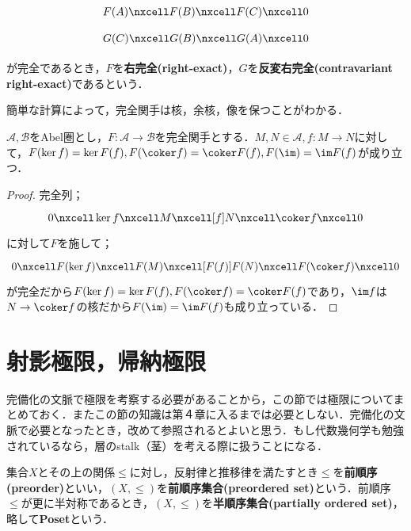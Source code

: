 \[\begin{tikzcd}
F(A)\nxcell F(B)\nxcell F(C)\nxcell0
\end{tikzcd}\]
\[\begin{tikzcd}
G(C)\nxcell G(B)\nxcell G(A)\nxcell 0
\end{tikzcd}\]

が完全であるとき，$F$を\textbf{右完全(right-exact)}，$G$を\textbf{反変右完全(contravariant right-exact)}であるという．

簡単な計算によって，完全関手は核，余核，像を保つことがわかる．
\begin{prop}\label{prop:完全関手は核，像を保つ}
	$\mathscr{A},\mathscr{B}$をAbel圏とし，$F:\mathscr{A}\to\mathscr{B}$を完全関手とする．$M,N\in\mathscr{A},f:M\to N$に対して，$F(\ker f)=\ker F(f),F(\coker f)=\coker F(f),F(\im)=\im F(f)$が成り立つ． 
\end{prop}

\begin{proof}
	完全列；
	\[\begin{tikzcd}
	0\nxcell\ker f\nxcell M\nxcell[f] N\nxcell\coker f\nxcell0
	\end{tikzcd}\]
	に対して$F$を施して；
	\[\begin{tikzcd}
	0\nxcell F(\ker f)\nxcell F(M)\nxcell[F(f)]F(N)\nxcell F(\coker f)\nxcell0
	\end{tikzcd}\]
	が完全だから$F(\ker f)=\ker F(f),F(\coker f)=\coker F(f)$であり，$\im f$は$N\to\coker f$の核だから$F(\im)=\im F(f)$も成り立っている．
\end{proof}

\section{射影極限，帰納極限}

完備化の文脈で極限を考察する必要があることから，この節では極限についてまとめておく．またこの節の知識は第４章に入るまでは必要としない．完備化の文脈で必要となったとき，改めて参照されるとよいと思う．もし代数幾何学も勉強されているなら，層のstalk（茎）を考える際に扱うことになる．

\begin{defi}
	集合$X$とその上の関係$\leq$に対し，反射律と推移律を満たすとき$\leq$を\textbf{前順序(preorder)}といい，$(X,\leq)$を\textbf{前順序集合(preordered set)}という．前順序$\leq$が更に半対称であるとき，$(X,\leq)$を\textbf{半順序集合(partially ordered set)}，略して\textbf{Poset}という．
\end{defi}

